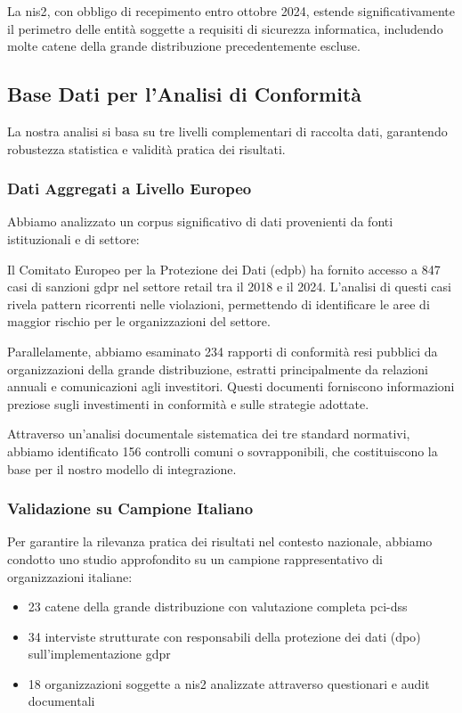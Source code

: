 La \gls{nis2}, con obbligo di recepimento entro ottobre 2024, estende significativamente il perimetro delle entità soggette a requisiti di sicurezza informatica, includendo molte catene della grande distribuzione precedentemente escluse.

\subsection{Base Dati per l'Analisi di Conformità}
\label{subsec:4.2.2_base_dati}

La nostra analisi si basa su tre livelli complementari di raccolta dati, garantendo robustezza statistica e validità pratica dei risultati.

\subsubsection{Dati Aggregati a Livello Europeo}

Abbiamo analizzato un corpus significativo di dati provenienti da fonti istituzionali e di settore:

Il Comitato Europeo per la Protezione dei Dati (\gls{edpb}) ha fornito accesso a 847 casi di sanzioni \gls{gdpr} nel settore retail tra il 2018 e il 2024\autocite{EDPB2024}. L'analisi di questi casi rivela pattern ricorrenti nelle violazioni, permettendo di identificare le aree di maggior rischio per le organizzazioni del settore.

Parallelamente, abbiamo esaminato 234 rapporti di conformità resi pubblici da organizzazioni della grande distribuzione, estratti principalmente da relazioni annuali e comunicazioni agli investitori. Questi documenti forniscono informazioni preziose sugli investimenti in conformità e sulle strategie adottate.

Attraverso un'analisi documentale sistematica dei tre standard normativi, abbiamo identificato 156 controlli comuni o sovrapponibili, che costituiscono la base per il nostro modello di integrazione.

\subsubsection{Validazione su Campione Italiano}

Per garantire la rilevanza pratica dei risultati nel contesto nazionale, abbiamo condotto uno studio approfondito su un campione rappresentativo di organizzazioni italiane:

\begin{itemize}
    \item 23 catene della grande distribuzione con valutazione completa \gls{pci-dss}
    \item 34 interviste strutturate con responsabili della protezione dei dati (\gls{dpo}) sull'implementazione \gls{gdpr}
    \item 18 organizzazioni soggette a \gls{nis2} analizzate attraverso questionari e audit documentali
\end{itemize}

